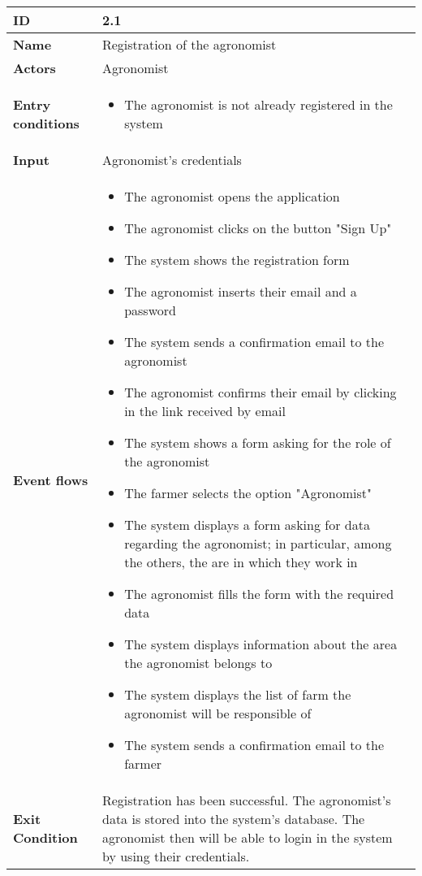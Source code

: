 \begin{longtable}[H]{ | l | p{10cm} | }
\hline
{\cellcolor[rgb]{0.753,0.753,0.753}}\textbf{ID}  & 2.1 \\ \hline
{\cellcolor[rgb]{0.753,0.753,0.753}}\textbf{Name} & Registration of the agronomist \\ \hline
{\cellcolor[rgb]{0.753,0.753,0.753}}\textbf{Actors} & Agronomist \\ \hline
{\cellcolor[rgb]{0.753,0.753,0.753}}\textbf{Entry conditions} &
\begin{itemize}
    \item The agronomist is not already registered in the system
\end{itemize}
\\ \hline
{\cellcolor[rgb]{0.753,0.753,0.753}}\textbf{Input} & Agronomist's credentials\\ \hline
{\cellcolor[rgb]{0.753,0.753,0.753}}\textbf{Event flows} &
\begin{itemize}
    \item The agronomist opens the application
    \item The agronomist clicks on the button "Sign Up"
    \item The system shows the registration form
    \item The agronomist inserts their email and a password
    \item The system sends a confirmation email to the agronomist
    \item The agronomist confirms their email by clicking in the link received by email
    \item The system shows a form asking for the role of the agronomist
    \item The farmer selects the option "Agronomist"
    \item The system displays a form asking for data regarding the agronomist; in particular, among the others, the are in which they work in
    \item The agronomist fills the form with the required data
    \item The system displays information about the area the agronomist belongs to
    \item The system displays the list of farm the agronomist will be responsible of
    \item The system sends a confirmation email to the farmer
\end{itemize}
\\ \hline
{\cellcolor[rgb]{0.753,0.753,0.753}}\textbf{Exit Condition} & Registration has been successful. The agronomist's data is stored into the system's database. The agronomist then will be able to login in the system by using their credentials.\\ \hline

\end{longtable}
